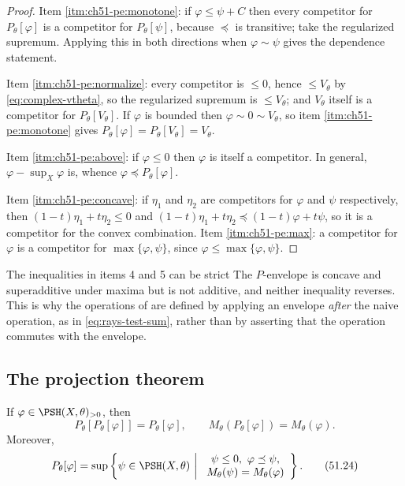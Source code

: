 \begin{proof}
Item \cref{itm:ch51-pe:monotone}: if \(\varphi\leq\psi+C\) then every
competitor for \(P_\theta[\varphi]\) is a competitor for
\(P_\theta[\psi]\), because \(\preceq\) is transitive; take the
regularized supremum.  Applying this in both directions when
\(\varphi\sim\psi\) gives the dependence statement.

Item \cref{itm:ch51-pe:normalize}: every competitor is \(\leq0\), hence
\(\leq V_\theta\) by \eqref{eq:complex-vtheta}, so the regularized
supremum is \(\leq V_\theta\); and \(V_\theta\) itself is a competitor for
\(P_\theta[V_\theta]\).  If \(\varphi\) is bounded then
\(\varphi\sim0\sim V_\theta\), so item \cref{itm:ch51-pe:monotone} gives
\(P_\theta[\varphi]=P_\theta[V_\theta]=V_\theta\).

Item \cref{itm:ch51-pe:above}: if \(\varphi\leq0\) then \(\varphi\) is
itself a competitor.  In general, \(\varphi-\sup_X\varphi\) is, whence
\(\varphi\preceq P_\theta[\varphi]\).

Item \cref{itm:ch51-pe:concave}: if \(\eta_1\) and \(\eta_2\) are
competitors for \(\varphi\) and \(\psi\) respectively, then
\((1-t)\eta_1+t\eta_2\leq0\) and
\((1-t)\eta_1+t\eta_2\preceq(1-t)\varphi+t\psi\), so it is a competitor
for the convex combination.  Item \cref{itm:ch51-pe:max}: a competitor for
\(\varphi\) is a competitor for \(\max\{\varphi,\psi\}\), since
\(\varphi\leq\max\{\varphi,\psi\}\).
\end{proof}

\begin{warning}{The inequalities in items 4 and 5 can be strict}
\label{warn:ch51-p-not-linear}
The \(P\)-envelope is concave and superadditive under maxima but is not
additive, and neither inequality reverses.  This is why the operations
of  are defined by applying an envelope
\emph{after} the naive operation, as in
\eqref{eq:rays-test-sum}, rather than by asserting that the operation
commutes with the envelope.
\end{warning}

\subsection{The projection theorem}
\label{sec:ch51-p-projection}

\begin{theorem}\label{thm:complex-p-projection}
If \(\varphi\in\PSH(X,\theta)_{>0}\), then
\[
 P_\theta[P_\theta[\varphi]]=P_\theta[\varphi],
\qquad
 M_\theta(P_\theta[\varphi])=M_\theta(\varphi).
\tag{51.23}\label{eq:complex-p-projection}
\]
Moreover,
\[
 P_\theta[\varphi]
 =\sup\left\{\psi\in\PSH(X,\theta)\ \middle|\
 \begin{array}{c}
 \psi\leq0,\ \varphi\preceq\psi,\\
 M_\theta(\psi)=M_\theta(\varphi)
 \end{array}\right\}.
\tag{51.24}\label{eq:complex-p-characterization}
\]
\end{theorem}


